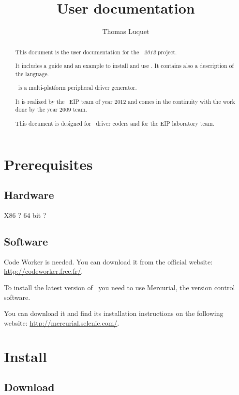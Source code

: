 \documentclass[american]{rtxreport}
\title{User documentation}
\author{Thomas Luquet}
\begin{document}
\maketitle

\begin{abstract}

This document is the user documentation for the \emph{\rtx\ 2012} project.

It includes a guide and an example to install and use \rtx. It contains also a
description of the language.

\rtx\ is a multi-platform peripheral driver generator.

It is realized by the \rtx\ EIP team of year 2012 and comes in the continuity
with the work done by the year 2009 team.

This document is designed for \rtx\ driver coders and for the EIP laboratory
team.

\end{abstract}

\rtxmaketitleblock

\tableofcontents

\chapter{Prerequisites}

\section{Hardware}

X86 ? 64 bit ?

\section{Software}

Code Worker is needed. You can download it from the official website:
\url{http://codeworker.free.fr/}.

To install the latest version of \rtx\ you need to use Mercurial, the version
control software.

You can download it and find its installation instructions on the following
website: \url{http://mercurial.selenic.com/}.

\chapter{Install \rtx}

\section{Download \rtx}
\end{document}
